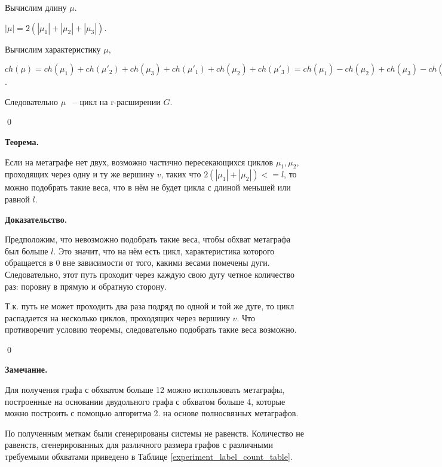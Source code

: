 \documentclass[14pt]{mmcs-article}
\begin{document}
Вычислим длину $\mu$.

$|\mu| = 2(|\mu_1| + |\mu_2| + |\mu_3|)$.

Вычислим характеристику $\mu$, 

$ch(\mu) = ch(\mu_1) + ch(\mu'_2) + ch(\mu_3) + ch(\mu'_1) + ch(\mu_2) + ch(\mu'_3) = ch(\mu_1) - ch(\mu_2) + ch(\mu_3) - ch(\mu_1) + ch(\mu_2) - ch(\mu_3) = 0$.

Следовательно $\mu$ ~-- цикл на r-расширении $G$.

\qed

\textbf{Теорема.}

Если на метаграфе нет двух, возможно частично пересекающихся циклов $\mu_1, \mu_2$, проходящих через одну и ту же вершину $v$, таких что  $2(|\mu_1| + |\mu_2|) <= l$, то можно подобрать такие веса, что в нём не будет цикла с длиной меньшей или равной $l$.

\textbf{Доказательство.}

Предположим, что невозможно подобрать такие веса, чтобы обхват метаграфа был больше $l$. Это значит, что на нём есть цикл, характеристика которого обращается в 0 вне зависимости от того, какими весами помечены дуги. Следовательно, этот путь проходит через каждую свою дугу четное количество раз: поровну в прямую и обратную сторону. 

Т.к. путь не может проходить два раза подряд по одной и той же дуге, то цикл распадается на несколько циклов, проходящих через вершину $v$. Что противоречит условию теоремы, следовательно подобрать такие веса возможно. 

\qed

\textbf{Замечание.}

Для получения графа с обхватом больше 12 можно использовать метаграфы, построенные на основании двудольного графа с обхватом больше 4, которые можно построить с помощью алгоритма 2. на основе полносвязных метаграфов.


По полученным меткам были сгенерированы системы не равенств. Количество не равенств, сгенерированных для различного размера графов с различными требуемыми обхватами приведено в Таблице \ref{experiment_label_count_table}. 
\end{document}
